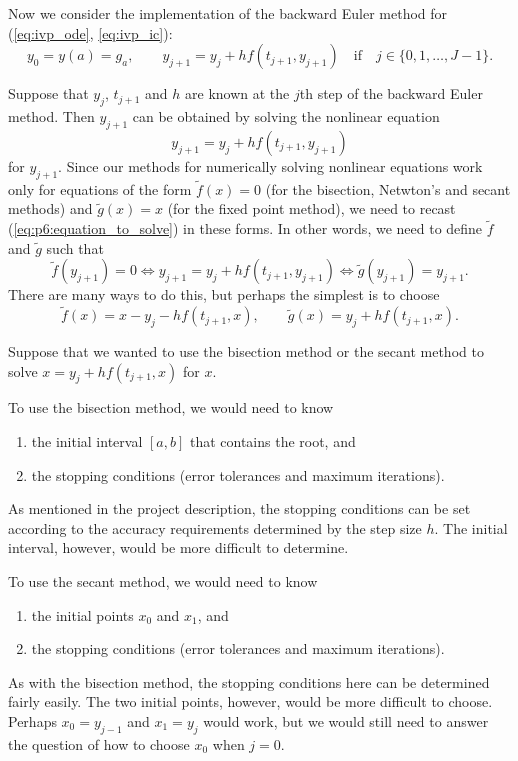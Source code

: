 \documentclass{homework}
\begin{document}
	Now we consider the implementation of the backward Euler method for (\ref{eq:ivp_ode}, \ref{eq:ivp_ic}):
	\begin{equation}
		y_0 = y(a) = g_a, \qquad y_{j+1} = y_j + hf(t_{j+1}, y_{j+1}) \quad\text{if}\quad j \in \{0,1,\dots, J-1\}.
	\end{equation}
	
	\question
	\newcommand{\newf}{\tilde{f}}
	\newcommand{\newg}{\tilde{g}}
	Suppose that $y_j$, $t_{j+1}$ and $h$ are known at the $j$th step of the backward Euler method. Then $y_{j+1}$ can be obtained by solving the nonlinear equation
	\begin{equation}
		\label{eq:p6:equation_to_solve}
		y_{j+1} = y_j + hf(t_{j+1}, y_{j+1})
	\end{equation}
	for $y_{j+1}$. Since our methods for numerically solving nonlinear equations work only for equations of the form $\newf(x) = 0$ (for the bisection, Netwton's and secant methods) and $\newg(x) = x$ (for the fixed point method), we need to recast (\ref{eq:p6:equation_to_solve}) in these forms. In other words, we need to define $\newf$ and $\newg$ such that
	\begin{equation}
		\newf(y_{j+1}) = 0 \iff y_{j+1} = y_j + hf(t_{j+1}, y_{j+1}) \iff \newg(y_{j+1}) = y_{j+1}.
	\end{equation}
	There are many ways to do this, but perhaps the simplest is to choose
	\begin{equation}
		\newf(x) = x - y_j - hf(t_{j+1}, x),\qquad \newg(x) = y_j + hf(t_{j+1}, x).
	\end{equation}
	
	\question
	Suppose that we wanted to use the bisection method or the secant method to solve $x = y_j + hf(t_{j+1}, x)$ for $x$.
	\begin{alphaparts}
		\questionpart To use the bisection method, we would need to know
		\begin{enumerate}[label=(\arabic*)]
			\item the initial interval $[a,b]$ that contains the root, and
			\item the stopping conditions (error tolerances and maximum iterations).
		\end{enumerate}
		As mentioned in the project description, the stopping conditions can be set according to the accuracy requirements determined by the step size $h$. The initial interval, however, would be more difficult to determine.
		
		\questionpart
		To use the secant method, we would need to know
		\begin{enumerate}[label=(\arabic*)]
			\item the initial points $x_0$ and $x_1$, and
			\item the stopping conditions (error tolerances and maximum iterations).
		\end{enumerate}
		As with the bisection method, the stopping conditions here can be determined fairly easily. The two initial points, however, would be more difficult to choose. Perhaps $x_0 = y_{j-1}$ and $x_1 = y_j$ would work, but we would still need to answer the question of how to choose $x_0$ when $j=0$.
	\end{alphaparts}
	
\end{document}
